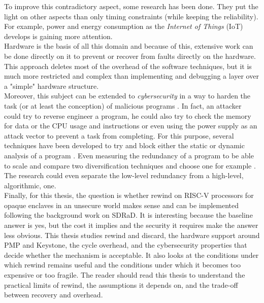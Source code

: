 \documentclass[11pt,a4paper]{report}
\begin{document}
To improve this contradictory aspect, some research has been done. 
They put the light on other aspects than only timing constraints (while keeping the reliability). 
For example, power and energy consumption as the \textit{Internet of Things} (IoT) develops \cite{iot} is gaining more attention.
\\

Hardware is the basis of all this domain and because of this, extensive work can be done directly on it to prevent or recover from faults directly on the hardware. 
This approach deletes most of the overhead of the software techniques, but it is much more restricted and complex than implementing and debugging a layer over a "simple" hardware structure. 
\\

Moreover, this subject can be extended to \textit{cybersecurity} in a way to harden the task (or at least the conception) of malicious programs \cite{diversification-obfuscation}. 
In fact, an attacker could try to reverse engineer a program, he could also try to check the memory for data or the CPU usage and instructions or even using the power supply as an attack vector \cite{ARM-TrustZone-CortexM} to prevent a task from completing. 
For this purpose, several techniques have been developed to try and block either the static or dynamic analysis of a program \cite{diversification-obfuscation}. 
Even measuring the redundancy of a program to be able to scale and compare two diversification techniques and choose one for example \cite{measure-redundancy}. 
The research could even separate the low-level redundancy from a high-level, algorithmic, one.
\\

Finally, for this thesis, the question is whether rewind on RISC-V processors for opaque enclaves in an unsecure world makes sense and can be implemented following the background work on SDRaD.
It is interesting because the baseline answer is yes, but the cost it implies and the security it requires make the answer less obvious.
This thesis studies rewind and discard, the hardware support around PMP and Keystone, the cycle overhead, and the cybersecurity properties that decide whether the mechanism is acceptable.
It also looks at the conditions under which rewind remains useful and the conditions under which it becomes too expensive or too fragile.
The reader should read this thesis to understand the practical limits of rewind, the assumptions it depends on, and the trade-off between recovery and overhead.
\\
\end{document}
